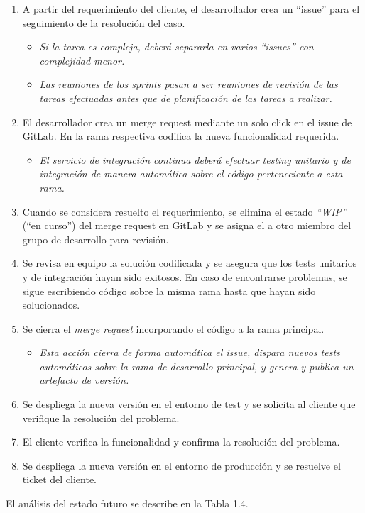 \begin{enumerate}
\item A partir del requerimiento del cliente, el desarrollador crea un “issue” para el seguimiento de la resolución del caso.
\begin{itemize}
\item \textit{Si la tarea es compleja, deberá separarla en varios “issues” con complejidad menor.}
\item \textit{Las reuniones de los sprints pasan a ser reuniones de revisión de las tareas efectuadas antes que de planificación de las tareas a realizar.}
\end{itemize}
\item El desarrollador crea un merge request mediante un solo click en el issue de GitLab. En la rama respectiva codifica la nueva funcionalidad requerida.
\begin{itemize}
\item \textit{El servicio de integración continua deberá efectuar testing unitario y de integración de manera automática sobre el código perteneciente a esta rama.}
\end{itemize}
\item Cuando se considera resuelto el requerimiento, se elimina el estado \textit{“WIP”} (“en curso”) del merge request en GitLab y se asigna el a otro miembro del grupo de desarrollo para revisión.
\item Se revisa en equipo la solución codificada y se asegura que los tests unitarios y de integración hayan sido exitosos. En caso de encontrarse problemas, se sigue escribiendo código sobre la misma rama hasta que hayan sido solucionados.
\item Se cierra el \textit{merge request} incorporando el código a la rama principal.
\begin{itemize}
\item \textit{Esta acción cierra de forma automática el issue, dispara nuevos tests automáticos sobre la rama de desarrollo principal, y genera y publica un artefacto de versión.}
\end{itemize}
\item Se despliega la nueva versión en el entorno de test  y se solicita al cliente que verifique la resolución del problema.
\item El cliente verifica la funcionalidad y confirma la resolución del problema.
\item Se despliega la nueva versión en el entorno de producción y se resuelve el ticket del cliente.
\end{enumerate}
El análisis del estado futuro se describe en la Tabla 1.4.

